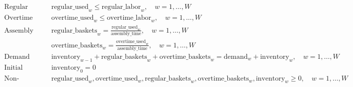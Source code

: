 \documentclass{article}
\begin{document}
\begin{align*}
\text{Regular Labor Constraint:} & \quad \text{regular\_used}_w \leq \text{regular\_labor}_w, \quad w = 1, \ldots, W \\
\text{Overtime Labor Constraint:} & \quad \text{overtime\_used}_w \leq \text{overtime\_labor}_w, \quad w = 1, \ldots, W \\
\text{Assembly Time Constraint:} & \quad \text{regular\_baskets}_w = \frac{\text{regular\_used}_w}{\text{assembly\_time}}, \quad w = 1, \ldots, W \\
& \quad \text{overtime\_baskets}_w = \frac{\text{overtime\_used}_w}{\text{assembly\_time}}, \quad w = 1, \ldots, W \\
\text{Demand Constraint:} & \quad \text{inventory}_{w-1} + \text{regular\_baskets}_w + \text{overtime\_baskets}_w = \text{demand}_w + \text{inventory}_w, \quad w = 1, \ldots, W \\
\text{Initial Inventory:} & \quad \text{inventory}_0 = 0 \\
\text{Non-negativity:} & \quad \text{regular\_used}_w, \text{overtime\_used}_w, \text{regular\_baskets}_w, \text{overtime\_baskets}_w, \text{inventory}_w \geq 0, \quad w = 1, \ldots, W
\end{align*}
\end{document}

